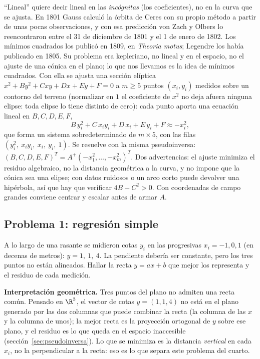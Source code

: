\begin{resultado}
``Lineal'' quiere decir lineal en las \emph{incógnitas} (los coeficientes), no en la curva
que se ajusta. En 1801 Gauss calculó la órbita de Ceres con su propio método a partir de
unas pocas observaciones, y con esa predicción von Zach y Olbers lo reencontraron entre el
31 de diciembre de 1801 y el 1 de enero de 1802. Los mínimos cuadrados los publicó en 1809,
en \emph{Theoria motus}; Legendre los había publicado en 1805. Su problema era kepleriano,
no lineal y en el espacio, no el ajuste de una cónica en el plano; lo que nos llevamos es
la idea de mínimos cuadrados. Con ella se ajusta una sección elíptica
\(x^2+By^2+Cxy+Dx+Ey+F=0\) a \(m\ge5\) puntos \((x_i,y_i)\) medidos sobre un contorno
del terreno (normalizar en \(1\) el coeficiente de \(x^2\) no deja afuera ninguna elipse:
toda elipse lo tiene distinto de cero): cada punto aporta una ecuación lineal en \(B,C,D,E,F\),
\[
  B\,y_i^2+C\,x_iy_i+D\,x_i+E\,y_i+F\approx-x_i^2 ,
\]
que forma un sistema sobredeterminado de \(m\times5\), con las filas
\((y_i^2,\ x_iy_i,\ x_i,\ y_i,\ 1)\). Se resuelve con la misma pseudoinversa:
\((B,C,D,E,F)^T=A^{+}(-x_1^2,\dots,-x_m^2)^T\). Dos advertencias: el ajuste minimiza
el residuo algebraico, no la distancia geométrica a la curva, y no impone que la cónica sea
una elipse; con datos ruidosos o un arco corto puede devolver una hipérbola, así que hay
que verificar \(4B-C^2>0\). Con coordenadas de campo grandes conviene centrar y escalar
antes de armar \(A\).
\end{resultado}

\subsection{Problema 1: regresión simple}

\begin{enunciado}[Enunciado]
A lo largo de una rasante se midieron cotas \(y_i\) en las progresivas \(x_i=-1,0,1\)
(en decenas de metros): \(y=1,\ 1,\ 4\). La pendiente debería ser constante, pero los tres
puntos no están alineados. Hallar la recta \(y=ax+b\) que mejor los representa y el
residuo de cada medición.
\end{enunciado}

\textbf{Interpretación geométrica.} Tres puntos del plano no admiten una recta común.
Pensado en \(\R^3\), el vector de cotas \(y=(1,1,4)\) no está en el plano generado por
las dos columnas que puede combinar la recta (la columna de las \(x\) y la columna de
unos); la mejor recta es la proyección ortogonal de \(y\) sobre ese plano, y el residuo
es lo que queda en el espacio inaccesible (sección~\ref{sec:pseudoinversa}). Lo que se
minimiza es la distancia \emph{vertical} en cada \(x_i\), no la perpendicular a la
recta: eso es lo que separa este problema del cuarto.

